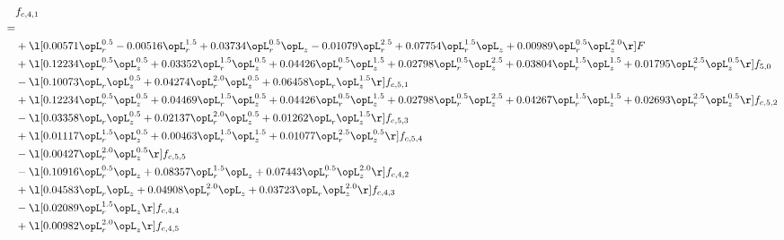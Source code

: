 \begin{alignat}{2} 
\label{eq:f_41_2} 
& f_{c,4,1} \nonumber \\ 
 = \\ 
& + \l[  0.00571 \opL_r^{0.5}   -0.00516 \opL_r^{1.5} +  0.03734 \opL_r^{0.5} \opL_z   -0.01079 \opL_r^{2.5} +  0.07754 \opL_r^{1.5} \opL_z +  0.00989 \opL_r^{0.5} \opL_z^{2.0}  \r] F \nonumber \\ 
& + \l[  0.12234 \opL_r^{0.5} \opL_z^{0.5} +  0.03352 \opL_r^{1.5} \opL_z^{0.5} +  0.04426 \opL_r^{0.5} \opL_z^{1.5} +  0.02798 \opL_r^{0.5} \opL_z^{2.5} +  0.03804 \opL_r^{1.5} \opL_z^{1.5} +  0.01795 \opL_r^{2.5} \opL_z^{0.5}  \r] f_{5,0} \nonumber \\ 
& - \l[  0.10073 \opL_r \opL_z^{0.5} +  0.04274 \opL_r^{2.0} \opL_z^{0.5} +  0.06458 \opL_r \opL_z^{1.5}  \r] f_{c,5,1} \nonumber \\ 
& + \l[  0.12234 \opL_r^{0.5} \opL_z^{0.5} +  0.04469 \opL_r^{1.5} \opL_z^{0.5} +  0.04426 \opL_r^{0.5} \opL_z^{1.5} +  0.02798 \opL_r^{0.5} \opL_z^{2.5} +  0.04267 \opL_r^{1.5} \opL_z^{1.5} +  0.02693 \opL_r^{2.5} \opL_z^{0.5}  \r] f_{c,5,2} \nonumber \\ 
& - \l[  0.03358 \opL_r \opL_z^{0.5} +  0.02137 \opL_r^{2.0} \opL_z^{0.5} +  0.01262 \opL_r \opL_z^{1.5}  \r] f_{c,5,3} \nonumber \\ 
& + \l[  0.01117 \opL_r^{1.5} \opL_z^{0.5} +  0.00463 \opL_r^{1.5} \opL_z^{1.5} +  0.01077 \opL_r^{2.5} \opL_z^{0.5}  \r] f_{c,5,4} \nonumber \\ 
& - \l[  0.00427 \opL_r^{2.0} \opL_z^{0.5}  \r] f_{c,5,5} \nonumber \\ 
& - \l[  0.10916 \opL_r^{0.5} \opL_z +  0.08357 \opL_r^{1.5} \opL_z +  0.07443 \opL_r^{0.5} \opL_z^{2.0}  \r] f_{c,4,2} \nonumber \\ 
& + \l[  0.04583 \opL_r \opL_z +  0.04908 \opL_r^{2.0} \opL_z +  0.03723 \opL_r \opL_z^{2.0}  \r] f_{c,4,3} \nonumber \\ 
& - \l[  0.02089 \opL_r^{1.5} \opL_z  \r] f_{c,4,4} \nonumber \\ 
& + \l[  0.00982 \opL_r^{2.0} \opL_z  \r] f_{c,4,5} \nonumber \\ 
\end{alignat} 


